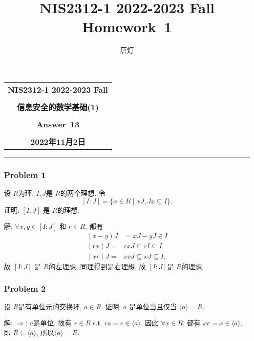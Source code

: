 \documentclass[a4paper,12pt]{ctexart}
\title{NIS2312-1 2022-2023 Fall Homework~1}
\author{唐灯}
\begin{document}
  \begin{center}

  \vspace{-0.3in}
  \begin{tabular}{c}
    \textbf{\Large NIS2312-1 2022-2023 Fall} \\
    \textbf{\Large  } \\
    \textbf{\Large  信息安全的数学基础(1)} \\
    \textbf{\Large  } \\
    \textbf{\Large  Answer~13} \\
    \textbf{\Large  } \\
    \textbf{\Large 2022年11月2日} \\
  \end{tabular}
  \end{center}
  \noindent
  \rule{\linewidth}{0.4pt}
  

\subsubsection*{Problem 1}
    设 $ R $为环, $ I,J $是 $ R $的两个理想. 令 
    \[[I:J]=\{x\in R\mid xJ,Jx\subseteq I\}.\]
    证明: $ [I:J] $ 是 $ R $的理想.

      解: $ \forall x,y\in [I:J] $ 和 $ r\in R $, 都有 
      \begin{align*}
        (x-y)J &= xJ-yJ\in I\\
        (rx)J =& rxJ\subseteq rI\subseteq I\\
        (xr)J =& xrJ\subseteq xJ\subseteq I.
      \end{align*}
      故 $ [I:J] $ 是 $ R $的左理想, 同理得到是右理想. 故 $ [I:J] $是 $ R $的理想.

\subsubsection*{Problem 2} 
    设 $ R $是有单位元的交换环, $ a\in R $. 证明: $ a $ 是单位当且仅当 $ \langle a\rangle=R $.

    解: 
    $ \Rightarrow $: $ a $是单位, 故有 $ r\in R $ s.t. $ ra=e\in \langle a\rangle $. 因此 $ \forall x\in R $, 
    都有 $ xe=x\in \langle a\rangle $, 即 $ R\subseteq \langle a\rangle $, 所以$ \langle a\rangle=R $.
\end{document}

